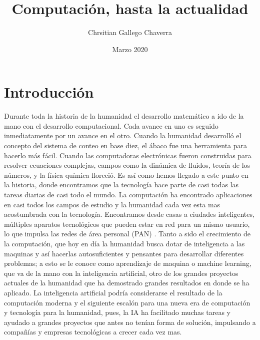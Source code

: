\documentclass{article}
\title{Computación, hasta la actualidad}
\author{Chrsitian Gallego Chaverra}
\date{Marzo 2020}
\begin{document}
\maketitle

\section{Introducción}
Durante toda la historia de la humanidad el desarrollo matemático a ido de la mano con el desarrollo computacional. Cada avance en uno es seguido inmediatamente por un avance en el otro. Cuando la humanidad desarrolló el concepto del sistema de conteo en base diez, el ábaco fue una herramienta para hacerlo más fácil. Cuando las computadoras electrónicas fueron construidas para resolver ecuaciones complejas, campos como la dinámica de fluidos, teoría de los números, y la física química floreció.
Es así como hemos llegado a este punto en la historia, donde encontramos que la tecnología hace parte de casi todas las tareas diarias de casi todo el mundo. La computación ha encontrado aplicaciones en casi todos los campos de estudio y la humanidad cada vez esta mas acostumbrada con la tecnología. Encontramos desde casas a ciudades inteligentes, múltiples aparatos tecnológicos que pueden estar en red para un mismo usuario, lo que impulsa las redes de área personal (PAN) \citep{pan}.
Tanto a sido el crecimiento de la computación, que hoy en día la humanidad busca dotar de inteligencia a las maquinas y así hacerlas autosuficientes y pensantes para desarrollar diferentes problemas; a esto se le conoce como aprendizaje de maquina o machine learning, que va de la mano con la inteligencia artificial, otro de los grandes proyectos actuales de la humanidad que ha demostrado grandes resultados en donde se ha aplicado. La inteligencia artificial podría considerarse el resultado de la computación moderna y el siguiente escalón para una nueva era de computación y tecnología para la humanidad, pues, la IA ha facilitado muchas tareas y ayudado a grandes proyectos que antes no tenían forma de solución, impulsando a compañías y empresas tecnológicas a crecer cada vez mas. \citep{ia}
  
\end{document}
